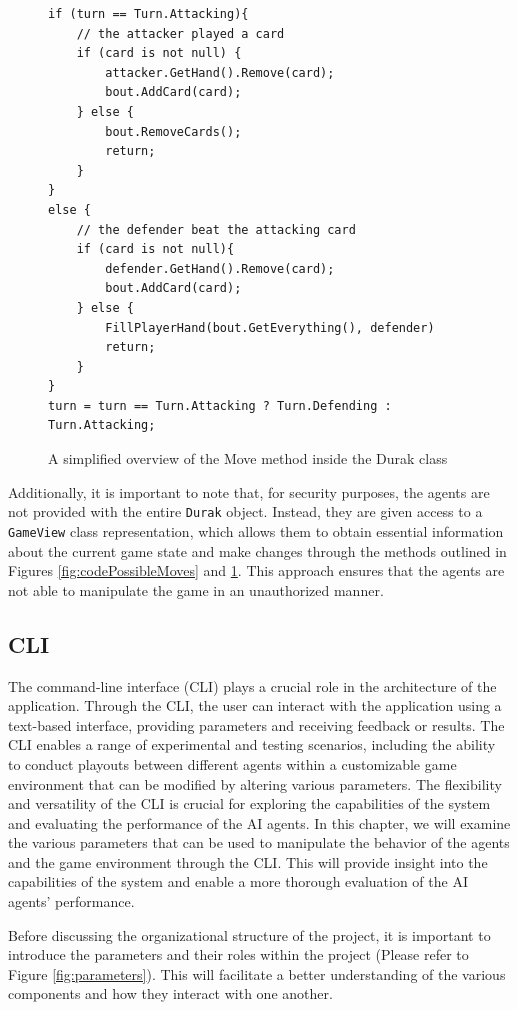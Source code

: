 \begin{figure}[h]
\captionsetup{justification=centering}
\begin{lstlisting}[frame=single]
if (turn == Turn.Attacking){
	// the attacker played a card	
	if (card is not null) {
		attacker.GetHand().Remove(card);
		bout.AddCard(card);
	} else {
		bout.RemoveCards();
		return;
	}
}
else {
	// the defender beat the attacking card
	if (card is not null){
		defender.GetHand().Remove(card);
		bout.AddCard(card);
	} else {
		FillPlayerHand(bout.GetEverything(), defender)
		return;
	}	
}
turn = turn == Turn.Attacking ? Turn.Defending : Turn.Attacking;
\end{lstlisting}
\caption{A simplified overview of the Move method inside the Durak class}
\label{fig:codeMove}
\end{figure}

Additionally, it is important to note that, for security purposes, the agents are not provided with the entire \texttt{Durak} object. Instead, they are given access to a \texttt{GameView} class representation, which allows them to obtain essential information about the current game state and make changes through the methods outlined in Figures \ref{fig:codePossibleMoves} and \ref{fig:codeMove}. This approach ensures that the agents are not able to manipulate the game in an unauthorized manner.


\subsection{CLI}
\label{CLI}

The command-line interface (CLI) plays a crucial role in the architecture of the application. Through the CLI, the user can interact with the application using a text-based interface, providing parameters and receiving feedback or results. The CLI enables a range of experimental and testing scenarios, including the ability to conduct playouts between different agents within a customizable game environment that can be modified by altering various parameters. The flexibility and versatility of the CLI is crucial for exploring the capabilities of the system and evaluating the performance of the AI agents. In this chapter, we will examine the various parameters that can be used to manipulate the behavior of the agents and the game environment through the CLI. This will provide insight into the capabilities of the system and enable a more thorough evaluation of the AI agents' performance.

Before discussing the organizational structure of the project, it is important to introduce the parameters and their roles within the project (Please refer to Figure \ref{fig:parameters}). This will facilitate a better understanding of the various components and how they interact with one another. 

